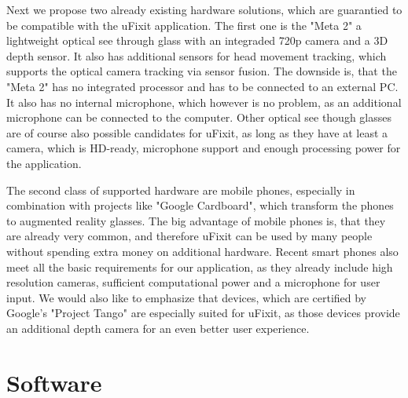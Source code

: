 Next we propose two already existing hardware solutions, which are guarantied to be compatible with the uFixit application. The first one is the "Meta 2" a lightweight optical see through glass with an integraded 720p camera and a 3D depth sensor. It also has additional sensors for head movement tracking, which supports the optical camera tracking via sensor fusion. The downside is, that the "Meta 2" has no integrated processor and has to be connected to an external PC. It also has no internal microphone, which however is no problem, as an additional microphone can be connected to the computer.
Other optical see though glasses are of course also possible candidates for uFixit, as long as they have at least a camera, which is HD-ready, microphone support and enough processing power for the application.

The second class of supported hardware are mobile phones, especially in combination with projects like "Google Cardboard", which transform the phones to augmented reality glasses. The big advantage of mobile phones is, that they are already very common, and therefore uFixit can be used by many people without spending extra money on additional hardware. Recent smart phones also meet all the basic requirements for our application, as they already include high resolution cameras, sufficient computational power and a microphone for user input. We would also like to emphasize that devices, which are certified by Google's "Project Tango" are especially suited for uFixit, as those devices provide an additional depth camera for an even better user experience.
				

\section{Software}
